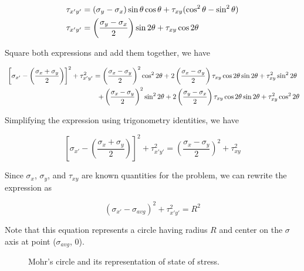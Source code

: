 \documentclass[
10pt,
a4paper,
openany,
svgnames,
]{book}
\begin{document}
\[\begin{gathered}
  \tau_{x'y'} = (\sigma_y - \sigma_x)\sin \theta \cos \theta  + \tau_{xy}(\cos^2\theta  - \sin^2\theta ) \\
  \tau_{x'y'} = \left( \frac{\sigma_y - \sigma_x}{2} \right)\sin 2\theta  + \tau _{xy}\cos 2\theta \hfill \\ 
\end{gathered} \]

Square both expressions and add them together, we have

\[\begin{gathered}
    \left[ \sigma_{x'} - \left( \frac{\sigma_x + \sigma_y}{2} \right) \right]^2 + \tau_{x'y'}^2 = \left( \frac{\sigma_x - \sigma_y}{2} \right)^2\cos^2 2\theta  + 2\left( \frac{\sigma_x - \sigma_y}{2} \right)\tau_{xy}\cos 2\theta \sin 2\theta  + \tau_{xy}^2\sin^2 2\theta \\
    \hspace{4.7cm} + \left( \frac{\sigma_x - \sigma_y}{2} \right)^2 \sin^2 2\theta  + 2\left( \frac{\sigma_y - \sigma_x}{2} \right)\tau_{xy}\cos 2\theta \sin 2\theta  + \tau_{xy}^2\cos^2 2\theta \\ 
\end{gathered} \]

Simplifying the expression using trigonometry identities, we have

\[\left[ \sigma_{x'} - \left( \frac{\sigma_x + \sigma_y}{2} \right) \right]^2 + \tau_{x'y'}^2 = \left( \frac{\sigma_x - \sigma_y}{2} \right)^2 + \tau_{xy}^2\]

Since $\sigma_x$, $\sigma_y$, and $\tau_{xy}$ are known quantities for the problem, we can rewrite the expression as

\begin{equation}
  (\sigma_{x'} - \sigma_{avg})^2 + \tau_{x'y'}^2 = R^2
\end{equation}

Note that this equation represents a circle having radius $R$ and center on the $\sigma$ axis at point ($\sigma_{avg}$, 0).

\begin{figure}[h]
  \centering
  \caption{Mohr's circle and its representation of state of stress.}
  \label{fig: mohr's circle}
\end{figure}
\end{document}
